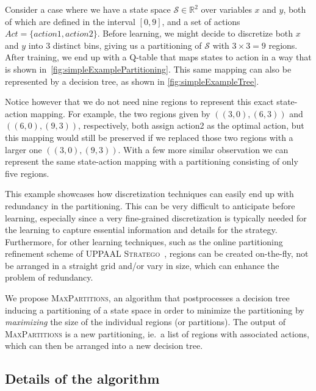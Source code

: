 \begin {example}

Consider a case where we have a state space $\mathcal{S} \in
\mathbb{R}^2$ over variables $x$ and $y$, both of which are defined in the
interval $[0,9]$, and a set of actions $Act = \{ action1, action2 \}$. Before
learning, we might decide to discretize both $x$ and $y$ into 3 distinct bins,
giving us a partitioning of $\mathcal{S}$ with $3\times3 = 9$ regions. After
training, we end up with a Q-table that maps states to action in a way that is
shown in~\cref{fig:simpleExamplePartitioning}. This same mapping can also be
represented by a decision tree, as shown in \cref{fig:simpleExampleTree}.


Notice however that we do not need nine regions to represent this exact
state-action mapping. For example, the two regions given by $((3,0),(6,3))$ and
$((6,0),(9,3))$, respectively, both assign  \textnormal {action2} as the
optimal action, but this mapping would still be preserved if we replaced those
two regions with a larger one $((3,0),(9,3))$.  With a few more similar
observation we can represent the same state-action mapping with a partitioning
consisting of only five regions.

\end {example}

This example showcases how discretization techniques can easily end up with
redundancy in the partitioning. This can be very difficult to anticipate before
learning, especially since a very fine-grained discretization is typically
needed for the learning to capture essential information and details for the
strategy. Furthermore, for other learning techniques, such as the online
partitioning refinement scheme of \textsc{UPPAAL Stratego}~\cite{Manfred2019},
regions can be created on-the-fly, not be arranged in a straight grid and/or
vary in size, which can enhance the problem of redundancy.

We propose \textsc{MaxPartitions}, an algorithm that postprocesses a decision
tree inducing a partitioning of a state space in order to minimize the
partitioning by \textit{maximizing} the size of the individual regions (or
partitions). The output of \textsc{MaxPartitions} is a new partitioning, ie.\ a
list of regions with associated actions, which can then be arranged into a new
decision tree.


\subsection{Details of the algorithm}%
\label{sub:maxPartsDescription}

